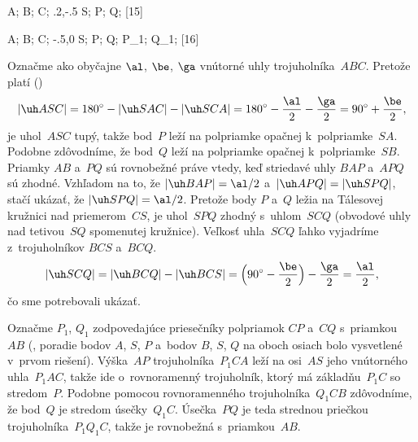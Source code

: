 {%
\fontplace
\tpoint A; \tpoint B; \bpoint C;
\tpoint\xy.2,-.5 S; \tpoint P; \tpoint{} Q;
[15] \hfil\Obr

\fontplace
\tpoint A; \tpoint B; \bpoint C;
\tpoint\xy-.5,0 S; \bpoint{} P; \bpoint Q;
\tpoint P_1; \tpoint Q_1;
[16] \hfil\Obr

Označme ako obyčajne $\al$, $\be$, $\ga$
vnútorné uhly trojuholníka~$ABC$. Pretože platí (\obr)
$$
|\uh ASC|=180^{\circ}-|\uh SAC|-|\uh SCA|=
180^{\circ}-\frac{\al}2-\frac{\ga}2=
90^{\circ}+\frac{\be}2,
$$
je uhol~$ASC$ tupý, takže bod~$P$ leží na polpriamke opačnej
k~polpriamke~$SA$. Podobne zdôvodníme, že bod~$Q$ leží na
polpriamke opačnej k~polpriamke~$SB$. Priamky $AB$ a~$PQ$ sú
\inspicture{}
rovnobežné práve vtedy, keď striedavé uhly $BAP$ a~$APQ$ sú zhodné.
Vzhľadom na to, že $|\uh BAP|=\al/2$ a~$|\uh
APQ|=|\uh SPQ|$, stačí ukázať, že $|\uh SPQ|=\al/2$.
Pretože body $P$ a~$Q$ ležia na Tálesovej kružnici nad priemerom~$CS$,
je uhol~$SPQ$ zhodný s~uhlom~$SCQ$ (obvodové uhly nad
tetivou~$SQ$ spomenutej kružnice). Veľkosť uhla~$SCQ$ ľahko
vyjadríme z~trojuholníkov $BCS$ a~$BCQ$.
$$
|\uh SCQ|=|\uh BCQ|-|\uh BCS|=
\Bigl(90^{\circ}-\frac{\be}2\Bigr)-\frac{\ga}2=\frac{\al}2,
$$
čo sme potrebovali ukázať.

\ineriesenie
Označme $P_1$, $Q_1$ zodpovedajúce priesečníky polpriamok $CP$
a~$CQ$ s~priamkou~$AB$ (\obr, poradie bodov $A$, $S$, $P$ a~bodov
$B$, $S$, $Q$ na oboch osiach bolo vysvetlené v~prvom riešení).
Výška~$AP$ trojuholníka~$P_1CA$ leží na osi~$AS$ jeho vnútorného uhla~$P_1AC$,
takže ide o~rovnoramenný trojuholník, ktorý má základňu~$P_1C$
so stredom~$P$. Podobne pomocou rovnoramenného trojuholníka~$Q_1CB$
zdôvodníme, že bod~$Q$ je stredom úsečky~$Q_1C$. Úsečka~$PQ$ je
teda strednou priečkou trojuholníka~$P_1Q_1C$, takže je rovnobežná
s~priamkou~$AB$.
\inspicture{}}

